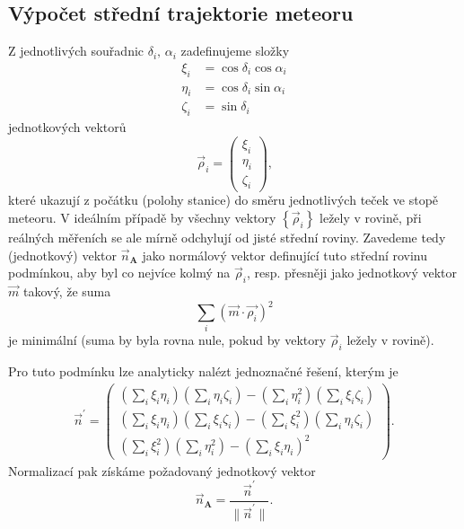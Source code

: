\subsection{Výpočet střední trajektorie meteoru}%
Z jednotlivých souřadnic $\delta_i,\,\alpha_i$ zadefinujeme složky
\begin{equation}
    \begin{aligned}
        \xi_i   & =\cos{\delta_i}\cos{\alpha_i} \\
        \eta_i  & =\cos{\delta_i}\sin{\alpha_i} \\
        \zeta_i & =\sin{\delta_i}
    \end{aligned}
\end{equation}
jednotkových vektorů
$$
    \vec{\rho}_i=\begin{pmatrix}
        \xi_i \\\eta_i\\\zeta_i
    \end{pmatrix}\text{,}
$$
které ukazují z počátku (polohy stanice) do směru jednotlivých teček ve stopě meteoru. V ideálním případě by všechny vektory $\left\{\vec{\rho}_i\right\}$ ležely v rovině, při reálných měřeních se ale mírně odchylují od jisté střední roviny. Zavedeme tedy (jednotkový) vektor $\vec{n}_\mathbf{A}$ jako normálový vektor definující tuto střední rovinu podmínkou, aby byl co nejvíce kolmý na $\vec{\rho}_i$, resp. přesněji jako jednotkový vektor $\vec{m}$ takový, že suma
$$
    \sum_{i}{\left( \vec{m}\cdot\vec{\rho_i} \right)^2}
$$
je minimální \cite{ceplecha} (suma by byla rovna nule, pokud by vektory $\vec{\rho}_i$ ležely v rovině).

Pro tuto podmínku lze analyticky nalézt jednoznačné řešení, kterým je \cite{ceplecha}
\begin{equation}
    \begin{aligned}
        \vec{n}^\prime=\begin{pmatrix}
                           \left( \sum_{i}{\xi_i\eta_i} \right)\left( \sum_{i}{\eta_i\zeta_i} \right)-\left( \sum_{i}{\eta_i^2} \right)\left( \sum_{i}{\xi_i\zeta_i} \right) \\
                           \left( \sum_{i}{\xi_i\eta_i} \right)\left( \sum_{i}{\xi_i\zeta_i} \right)-\left( \sum_{i}{\xi_i^2} \right)\left( \sum_{i}{\eta_i\zeta_i} \right)  \\
                           \left( \sum_{i}{\xi_i^2} \right)\left( \sum_{i}{\eta_i^2} \right)-\left( \sum_{i}{\xi_i\eta_i} \right)^2
                       \end{pmatrix}\text{.}
    \end{aligned}
\end{equation}
Normalizací pak získáme požadovaný jednotkový vektor
\begin{equation}
    \vec{n}_\mathbf{A}=\frac{\vec{n}^\prime}{\lVert \vec{n}^\prime \rVert }\text{.}
\end{equation}

